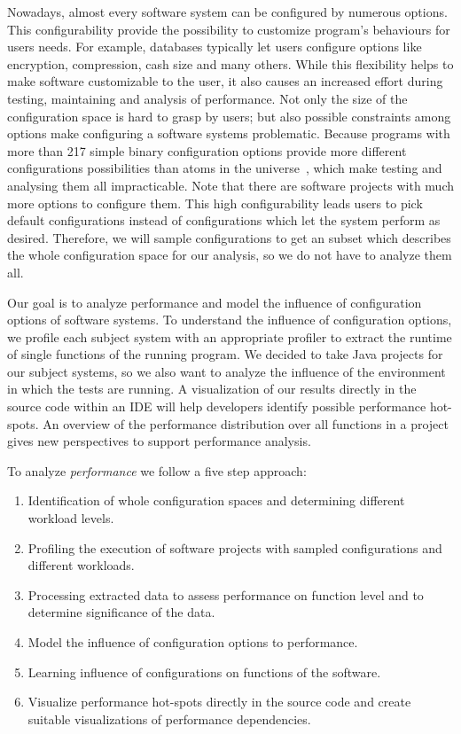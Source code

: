 Nowadays, almost every software system can be configured by numerous options. 
This configurability provide the possibility to customize program's behaviours for users needs. 
For example, databases typically let users configure options like encryption, compression, cash size and many others. 
While this flexibility helps to make software customizable to the user, it also causes an increased effort during testing, maintaining and analysis of performance. 
Not only the size of the configuration space is hard to grasp by users; but also possible constraints among options make configuring a software systems problematic.
Because programs with more than 217 simple binary configuration options provide more different configurations possibilities than atoms in the universe~\citep{krueger2006new}, which make testing and analysing them all impracticable. 
Note that there are software projects with much more options to configure them. 
This high configurability leads users to pick default configurations instead of configurations which let the system perform as desired. 
Therefore, we will sample configurations to get an subset which describes the whole configuration space for our analysis, so we do not have to analyze them all.

Our goal is to analyze performance and model the influence of configuration options of software systems. 
To understand the influence of configuration options, we profile each subject system with an appropriate profiler to extract the runtime of single functions of the running program. 
We decided to take Java projects for our subject systems, so we also want to analyze the influence of the environment in which the tests are running. 
A visualization of our results directly in the source code within an \ac{IDE} will help developers identify possible performance hot-spots. 
An overview of the performance distribution over all functions in a project gives new perspectives to support performance analysis.


To analyze \textit{performance} we follow a five step approach:

\begin{enumerate}
	\item Identification of whole configuration spaces and determining different workload levels.
	\item Profiling the execution of software projects with sampled configurations and different workloads.
	\item Processing extracted data to assess performance on function level and to determine significance of the data.
	\item Model the influence of configuration options to performance.
	\item Learning influence of configurations on functions of the software.
	\item Visualize performance hot-spots directly in the source code and create suitable visualizations of performance dependencies.
\end{enumerate}


